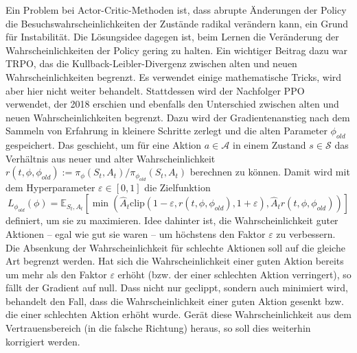 Ein Problem bei Actor-Critic-Methoden ist, dass abrupte Änderungen der Policy die Besuchswahrscheinlichkeiten der Zustände radikal verändern kann, ein Grund für Instabilität.
Die Lösungsidee dagegen ist, beim Lernen die Veränderung der Wahrscheinlichkeiten der Policy gering zu halten.
Ein wichtiger Beitrag dazu war TRPO, das die Kullback-Leibler-Divergenz zwischen alten und neuen Wahrscheinlichkeiten begrenzt. \cite{trpo2015}
Es verwendet einige mathematische Tricks, wird aber hier nicht weiter behandelt.
Stattdessen wird der Nachfolger PPO verwendet, der 2018 erschien und ebenfalls den Unterschied zwischen alten und neuen Wahrscheinlichkeiten begrenzt. \cite{ppo2018}
Dazu wird der Gradientenanstieg nach dem Sammeln von Erfahrung in kleinere Schritte zerlegt und die alten Parameter $\phi_{old}$ gespeichert.
Das geschieht, um für eine Aktion $a \in \mathcal{A}$ in einem Zustand $s \in \mathcal{S}$ das Verhältnis aus neuer und alter Wahrscheinlichkeit $r(t, \phi, \phi_{old}) := \pi_\phi(S_t, A_t) / \pi_{\phi_{old}}(S_t, A_t)$ berechnen zu können.
Damit wird mit dem Hyperparameter $\varepsilon \in [0, 1]$ die Zielfunktion
\begin{equation}
	L_{\phi_{old}}(\phi) = \mathbb{E}_{S_t, A_t}\left[\min{\left(\hat{A}_t \text{clip}{\left(1 - \varepsilon, r(t, \phi, \phi_{old}), 1 + \varepsilon\right)}, \hat{A}_t r(t, \phi, \phi_{old})\right)}\right]
\end{equation}
definiert, um sie zu maximieren.
Idee dahinter ist, die Wahrscheinlichkeit guter Aktionen -- egal wie gut sie waren -- um höchstens den Faktor $\varepsilon$ zu verbessern.
Die Absenkung der Wahrscheinlichkeit für schlechte Aktionen soll auf die gleiche Art begrenzt werden.
Hat sich die Wahrscheinlichkeit einer guten Aktion bereits um mehr als den Faktor $\varepsilon$ erhöht (bzw. der einer schlechten Aktion verringert), so fällt der Gradient auf null.
Dass nicht nur geclippt, sondern auch minimiert wird, behandelt den Fall, dass die Wahrscheinlichkeit einer guten Aktion gesenkt bzw. die einer schlechten Aktion erhöht wurde.
Gerät diese Wahrscheinlichkeit aus dem Vertrauensbereich (in die falsche Richtung) heraus, so soll dies weiterhin korrigiert werden.


